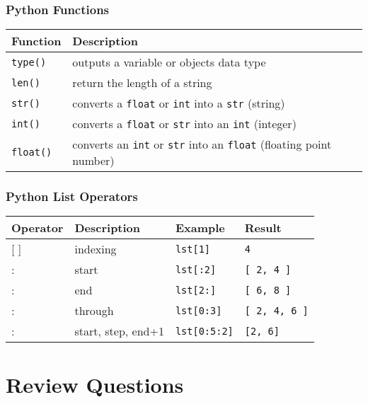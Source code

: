 \documentclass{book}
\newcommand{\passthrough}[1]{#1}
\begin{document}
\hypertarget{python-functions}{%
\subsubsection{Python Functions}\label{python-functions}}

\begin{longtable}[]{@{}ll@{}}
\toprule
Function & Description\tabularnewline
\midrule
\endhead
\passthrough{\lstinline!type()!} & outputs a variable or objects data
type\tabularnewline
\passthrough{\lstinline!len()!} & return the length of a
string\tabularnewline
\passthrough{\lstinline!str()!} & converts a
\passthrough{\lstinline!float!} or \passthrough{\lstinline!int!} into a
\passthrough{\lstinline!str!} (string)\tabularnewline
\passthrough{\lstinline!int()!} & converts a
\passthrough{\lstinline!float!} or \passthrough{\lstinline!str!} into an
\passthrough{\lstinline!int!} (integer)\tabularnewline
\passthrough{\lstinline!float()!} & converts an
\passthrough{\lstinline!int!} or \passthrough{\lstinline!str!} into an
\passthrough{\lstinline!float!} (floating point number)\tabularnewline
\bottomrule
\end{longtable}

\hypertarget{python-list-operators}{%
\subsubsection{Python List Operators}\label{python-list-operators}}

\begin{longtable}[]{@{}llll@{}}
\toprule
Operator & Description & Example & Result\tabularnewline
\midrule
\endhead
{[} {]} & indexing & \passthrough{\lstinline!lst[1]!} &
\passthrough{\lstinline!4!}\tabularnewline
: & start & \passthrough{\lstinline!lst[:2]!} &
\passthrough{\lstinline![ 2, 4 ]!}\tabularnewline
: & end & \passthrough{\lstinline!lst[2:]!} &
\passthrough{\lstinline![ 6, 8 ]!}\tabularnewline
: & through & \passthrough{\lstinline!lst[0:3]!} &
\passthrough{\lstinline![ 2, 4, 6 ]!}\tabularnewline
: & start, step, end+1 & \passthrough{\lstinline!lst[0:5:2]!} &
\passthrough{\lstinline![2, 6]!}\tabularnewline
\bottomrule
\end{longtable}
    




    
        \hypertarget{review-questions}{%
\section{Review Questions}\label{review-questions}}
    
\end{document}
